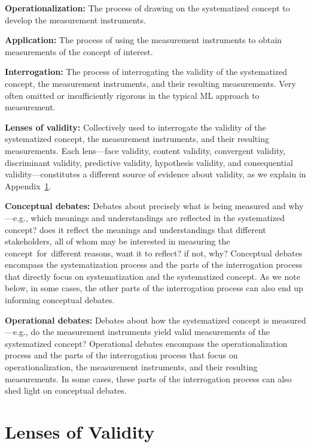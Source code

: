 \documentclass{article}
\begin{document}
\textbf{Operationalization:} The process of drawing on the
systematized concept to develop the measurement instruments.

\textbf{Application:} The process of using the measurement
instruments to obtain measurements of the concept of interest.

\textbf{Interrogation:} The process of interrogating the validity of the systematized concept, the measurement
instruments, and their resulting measurements. Very often omitted or insufficiently rigorous in the typical ML approach to measurement.

\textbf{Lenses of validity:} 
Collectively used to interrogate the validity of the systematized concept, the measurement instruments, and their resulting measurements. Each lens---face validity, content validity, convergent validity, discriminant validity, predictive validity, hypothesis validity, and consequential validity---constitutes a different source of evidence about validity, as we explain in Appendix~\ref{sec:interrogating_validity}.

\textbf{Conceptual debates:} Debates about precisely what is being measured and why---e.g., which meanings and understandings are reflected in the systematized concept? does it
reflect the meanings and understandings that different stakeholders, all of whom may be interested in measuring the concept~for~different reasons, want it to reflect? if not, why? Conceptual debates encompass the systematization process and the parts of the interrogation process that directly focus on systematization and the systematized concept. As we note below, in some cases, the other parts of the interrogation process can also end up informing conceptual debates.

\textbf{Operational debates:} Debates about how the systematized concept is measured---e.g., do the measurement instruments yield valid measurements of the systematized concept? Operational debates encompass the operationalization process and the parts of the interrogation process that focus on operationalization, the measurement instruments, and their resulting measurements. In some cases, these parts of the interrogation process can also shed light on conceptual debates.

\section{Lenses of Validity}
\label{sec:interrogating_validity}
\end{document}
